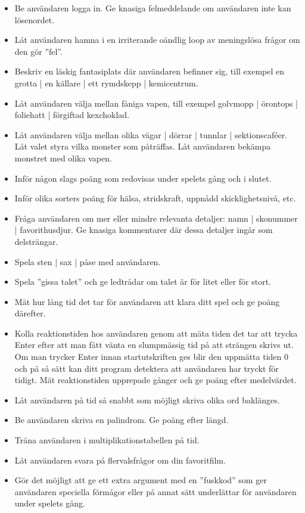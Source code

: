 \begin{itemize}
\item Be användaren logga in. Ge knasiga felmeddelande om användaren inte kan lösenordet.
\item Låt användaren hamna i en irriterande oändlig loop av meningslösa frågor om den gör ''fel''.
\item Beskriv en läskig fantasiplats där användaren befinner sig, till exempel en grotta | en källare | ett rymdskepp | kemicentrum.
\item Låt användaren välja mellan fåniga vapen, till exempel golvmopp | örontops | foliehatt | förgiftad kexchoklad.
\item Låt användaren välja mellan olika vägar | dörrar | tunnlar | sektionscaféer. Låt valet styra vilka monster som påträffas. Låt användaren bekämpa monstret med olika vapen.
\item Inför någon slags poäng som redovisas under spelets gång och i slutet.
\item Inför olika sorters poäng för hälsa, stridskraft, uppnådd skicklighetsnivå, etc.
\item Fråga användaren om mer eller mindre relevanta detaljer: namn | skonummer | favorithusdjur. Ge knasiga kommentarer där dessa detaljer ingår som delsträngar.
\item Spela sten | sax | påse med användaren.
\item Spela ''gissa talet'' och ge ledtrådar om talet är för litet eller för stort.
\item Mät hur lång tid det tar för användaren att klara ditt spel och ge poäng därefter.
\item Kolla reaktionstiden hos användaren genom att mäta tiden det tar att trycka Enter efter att man fått vänta en slumpmässig tid på att strängen  skrivs ut. Om man trycker Enter innan startutskriften ges blir den uppmätta tiden 0 och på så sätt kan ditt program detektera att användaren har tryckt för tidigt. Mät reaktionstiden upprepade gånger och ge poäng efter medelvärdet.
\item Låt användaren på tid så snabbt som möjligt skriva olika ord baklänges.
\item Be användaren skriva en palindrom. Ge poäng efter längd.
\item Träna användaren i multiplikationstabellen på tid.
\item Låt användaren svara på flervalsfrågor om din favoritfilm.
\item Gör det möjligt att ge ett extra argument med en ''fuskkod'' som ger användaren speciella förmågor eller på annat sätt underlättar för användaren under spelets gång.
\end{itemize}



